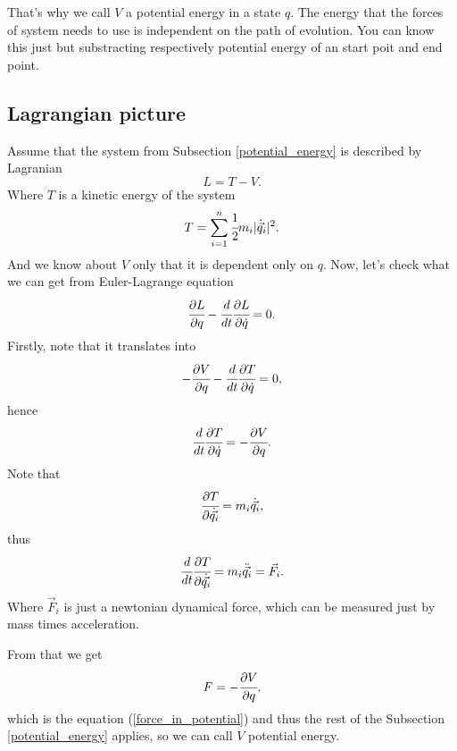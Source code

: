 \documentclass[main.tex]{subfiles}
\begin{document}
That's why we call $V$ a potential energy in a state $q$. The energy that the forces of system needs to use is independent on the path of evolution. You can know this just but substracting respectively potential energy of an start poit and end point.

\subsection{Lagrangian picture}
\label{lagrange-picture}
Assume that the system from Subsection \ref{potential_energy} is described by Lagranian 
\begin{equation}
\label{lagrange_kinetic_assumption}
L = T - V.
\end{equation}
Where $T$ is a kinetic energy of the system
\begin{equation}
T = \sum_{i=1}^n \cfrac{1}{2}m_i|\dot{\vec{q}}_i|^2.
\end{equation}
And we know about $V$ only that it is dependent only on $q$.
Now, let's check what we can get from Euler-Lagrange equation
\begin{equation}
\label{lagrange_equation2}
\cfrac{\partial L}{\partial q} - \cfrac{d}{dt}\cfrac{\partial L}{\partial \dot{q}} = 0.
\end{equation}
Firstly, note that it translates into
\begin{equation}
-\cfrac{\partial V}{\partial q} - \cfrac{d}{dt}\cfrac{\partial T}{\partial \dot{q}} = 0,
\end{equation}
hence 
\begin{equation}
\cfrac{d}{dt}\cfrac{\partial T}{\partial \dot{q}} = -\cfrac{\partial V}{\partial q}.
\end{equation}
Note that
\begin{equation}
\cfrac{\partial T}{\partial \dot{\vec{q_i}}} = m_i\dot{\vec{q_i}},
\end{equation}
thus
\begin{equation}
\cfrac{d}{dt}\cfrac{\partial T}{\partial \dot{\vec{q_i}}} = m_i\ddot{\vec{q_i}} = \vec{F}_i.
\end{equation} 
Where  $\vec{F}_i$ is just a newtonian dynamical force, which can be measured just by mass times acceleration.

From that we get
\begin{equation}
F = -\cfrac{\partial V}{\partial q},
\end{equation}
which is the equation (\ref{force_in_potential}) and thus the rest of the Subsection \ref{potential_energy} applies, so we can call $V$ potential energy.
\end{document}
